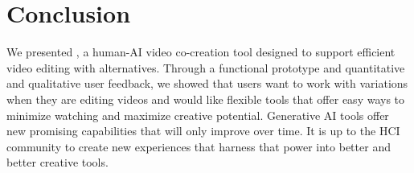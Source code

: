 \section{Conclusion}
We presented \sysname{}, a human-AI video co-creation tool designed to support efficient video editing with alternatives. Through a functional prototype and quantitative and qualitative user feedback, we showed that users want to work with variations when they are editing videos and would like flexible tools that offer easy ways to minimize watching and maximize creative potential.  Generative AI tools offer new promising capabilities that will only improve over time. It is up to the HCI community to create new experiences that harness that power into better and better creative tools.